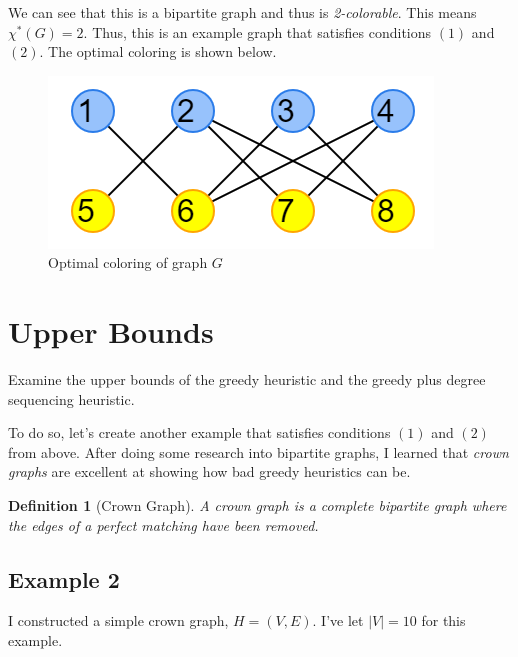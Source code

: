\documentclass{article}
\newtheorem*{definition}{Definition}
\begin{document}
We can see that this is a bipartite graph and thus is \emph{2-colorable}. This means \(\chi^{*}(G) = 2\). Thus, this is an example graph that satisfies conditions \((1)\) and \((2)\). The optimal coloring is shown below.

\begin{figure}[H]
\centering
\includegraphics[scale=0.5]{graph-3.png}
\caption{Optimal coloring of graph \(G\)}
\end{figure}

\newpage

\section*{Upper Bounds}
Examine the upper bounds of the greedy heuristic and the greedy plus degree sequencing heuristic. \newline

To do so, let's create another example that satisfies conditions \((1)\) and \((2)\) from above. After doing some research into bipartite graphs, I learned that \emph{crown graphs} are excellent at showing how bad greedy heuristics can be.

\begin{definition}[Crown Graph]
A crown graph is a complete bipartite graph where the edges of a perfect matching have been removed.
\end{definition}

\subsection*{Example 2}

I constructed a simple crown graph, \(H = (V, E)\). I've let \(|V| = 10\) for this example.
\end{document}
